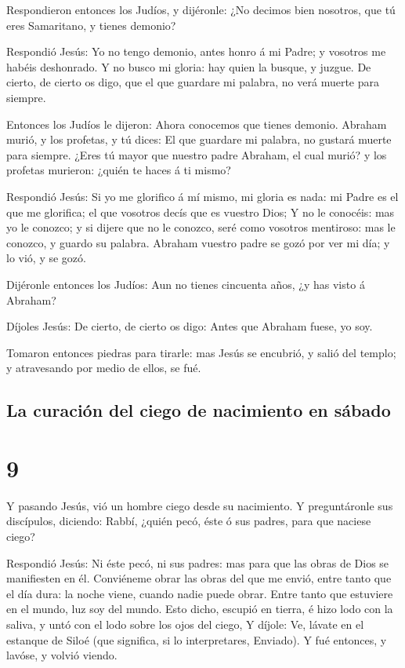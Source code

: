  Respondieron entonces los Judíos, y dijéronle: ¿No decimos
bien nosotros, que tú eres Samaritano, y tienes demonio?

 Respondió Jesús: Yo no tengo demonio, antes honro á mi
Padre; y vosotros me habéis deshonrado.  Y no busco mi
gloria: hay quien la busque, y juzgue.  De cierto, de
cierto os digo, que el que guardare mi palabra, no verá muerte para
siempre.

 Entonces los Judíos le dijeron: Ahora conocemos que tienes
demonio. Abraham murió, y los profetas, y tú dices: El que guardare mi
palabra, no gustará muerte para siempre.  ¿Eres tú mayor
que nuestro padre Abraham, el cual murió? y los profetas murieron:
¿quién te haces á ti mismo?

 Respondió Jesús: Si yo me glorifico á mí mismo, mi gloria
es nada: mi Padre es el que me glorifica; el que vosotros decís que es
vuestro Dios;  Y no le conocéis: mas yo le conozco; y si
dijere que no le conozco, seré como vosotros mentiroso: mas le conozco,
y guardo su palabra.  Abraham vuestro padre se gozó por ver
mi día; y lo vió, y se gozó.

 Dijéronle entonces los Judíos: Aun no tienes cincuenta
años, ¿y has visto á Abraham?

 Díjoles Jesús: De cierto, de cierto os digo: Antes que
Abraham fuese, yo soy.

 Tomaron entonces piedras para tirarle: mas Jesús se
encubrió, y salió del templo; y atravesando por medio de ellos, se fué.

\hypertarget{la-curaciuxf3n-del-ciego-de-nacimiento-en-suxe1bado}{%
\subsection{La curación del ciego de nacimiento en
sábado}\label{la-curaciuxf3n-del-ciego-de-nacimiento-en-suxe1bado}}

\hypertarget{section-8}{%
\section{9}\label{section-8}}

 Y pasando Jesús, vió un hombre ciego desde su nacimiento.
 Y preguntáronle sus discípulos, diciendo: Rabbí, ¿quién
pecó, éste ó sus padres, para que naciese ciego?

 Respondió Jesús: Ni éste pecó, ni sus padres: mas para que
las obras de Dios se manifiesten en él.  Conviéneme obrar
las obras del que me envió, entre tanto que el día dura: la noche viene,
cuando nadie puede obrar.  Entre tanto que estuviere en el
mundo, luz soy del mundo.  Esto dicho, escupió en tierra, é
hizo lodo con la saliva, y untó con el lodo sobre los ojos del ciego,
 Y díjole: Ve, lávate en el estanque de Siloé (que
significa, si lo interpretares, Enviado). Y fué entonces, y lavóse, y
volvió viendo.


